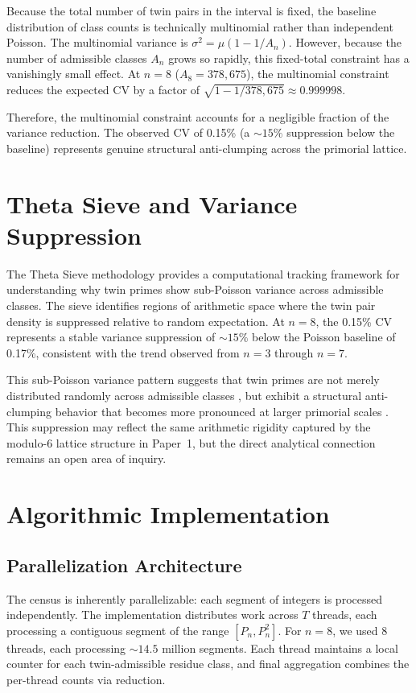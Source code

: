 \documentclass[11pt]{article}
\begin{document}
Because the total number of twin pairs in the interval is fixed, the baseline distribution of class counts is technically multinomial rather than independent Poisson. The multinomial variance is $\sigma^2 = \mu(1 - 1/A_n)$. However, because the number of admissible classes $A_n$ grows so rapidly, this fixed-total constraint has a vanishingly small effect. At $n=8$ ($A_8 = 378{,}675$), the multinomial constraint reduces the expected CV by a factor of $\sqrt{1 - 1/378{,}675} \approx 0.999998$. 

Therefore, the multinomial constraint accounts for a negligible fraction of the variance reduction. The observed CV of 0.15\% (a $\sim 15\%$ suppression below the baseline) represents genuine structural anti-clumping across the primorial lattice.

\section{Theta Sieve and Variance Suppression}
\label{sec:theta}

The Theta Sieve methodology provides a computational tracking framework for understanding why twin primes show sub-Poisson variance across admissible classes. The sieve identifies regions of arithmetic space where the twin pair density is suppressed relative to random expectation. At $n=8$, the 0.15\% CV represents a stable variance suppression of $\sim 15\%$ below the Poisson baseline of 0.17\%, consistent with the trend observed from $n=3$ through $n=7$.

This sub-Poisson variance pattern suggests that twin primes are not merely distributed randomly across admissible classes \cite{Bre14}, but exhibit a structural anti-clumping behavior that becomes more pronounced at larger primorial scales \cite{Mai85}. This suppression may reflect the same arithmetic rigidity captured by the modulo-6 lattice structure in Paper~1, but the direct analytical connection remains an open area of inquiry.

\section{Algorithmic Implementation}
\label{sec:implementation}

\subsection{Parallelization Architecture}

The census is inherently parallelizable: each segment of integers is processed independently. The implementation distributes work across $T$ threads, each processing a contiguous segment of the range $[P_n, P_n^2]$. For $n=8$, we used 8 threads, each processing $\sim 14.5$ million segments. Each thread maintains a local counter for each twin-admissible residue class, and final aggregation combines the per-thread counts via reduction.
\end{document}
